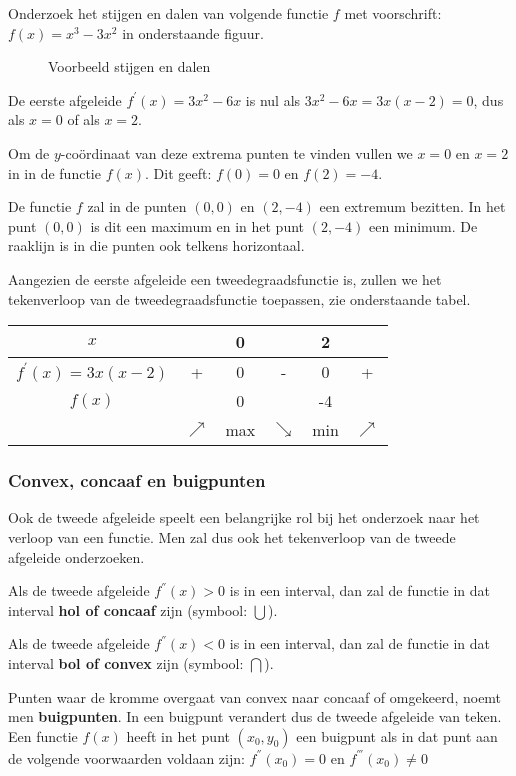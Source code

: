 \begin{voorbeeld}
	Onderzoek het stijgen en dalen van volgende functie $f$ met voorschrift: $f(x)=x^{3}-3x^{2}$ in onderstaande figuur.


\begin{figure}[H]
	\centering          
	
	\caption{Voorbeeld stijgen en dalen}
	\label{fig:verloop_stijgen_en_dalen}	
\end{figure}
De eerste afgeleide $f^{'}(x)=3x^{2}-6x$ is nul als $3x^{2}-6x=3x(x-2)=0$, dus als $x=0$ of als $x=2$.

Om de $y$-co\"ordinaat van deze extrema punten te vinden
vullen we $x=0$ en $x=2$ in in de functie $f(x)$. Dit geeft: $f(0)=0$
en $f(2)=-4$.

De functie $f$ zal in de punten $(0,0)$ en $(2,-4)$ een
extremum bezitten. In het punt $(0,0)$ is dit een maximum en in het
punt $(2,-4)$ een minimum. De raaklijn is in die punten ook telkens
horizontaal.

Aangezien de eerste afgeleide een tweedegraadsfunctie is,
zullen we het tekenverloop van de tweedegraadsfunctie toepassen, zie onderstaande tabel.

\begin{center}
	\begin{tabular}{c||c|c|c|c|c}
	$x$ &  & 0 &  & 2 & \tabularnewline
	\hline 
	$f^{'}(x)=3x(x-2)$ & + & 0 & - & 0 & + \\
	\hline 
	$f(x)$ &  & 0 &  & -4 & \\
	& $\nearrow$ & max & $\searrow$ & min & $\nearrow$ \\
\end{tabular}
\end{center}


\end{voorbeeld}

\subsubsection{Convex, concaaf en buigpunten}

Ook de tweede afgeleide speelt een belangrijke rol bij het
onderzoek naar het verloop van een functie. Men zal dus ook het tekenverloop
van de tweede afgeleide onderzoeken.


\begin{definitie}
	Als de tweede afgeleide $f^{''}(x)>0$ is in een interval,
dan zal de functie in dat interval \textbf{hol of concaaf} zijn (symbool:
$\bigcup$).

Als de tweede afgeleide $f^{''}(x)<0$ is in een interval,
dan zal de functie in dat interval \textbf{bol of convex} zijn (symbool:
$\bigcap$).

Punten waar de kromme overgaat van convex naar concaaf of
omgekeerd, noemt men \textbf{buigpunten}. In een buigpunt verandert
dus de tweede afgeleide van teken. Een functie $f(x)$ heeft in het
punt $(x_{0},y_{0})$ een buigpunt als in dat punt aan de volgende
voorwaarden voldaan zijn: $f^{''}(x_{0})=0$ en $f^{'''}(x_{0})\neq0$

\end{definitie}


